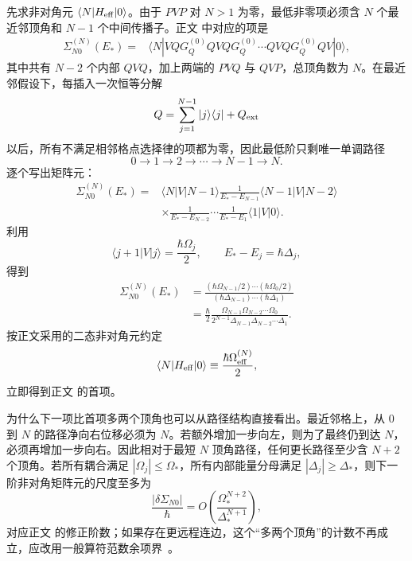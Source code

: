 \begin{derivation}
先求非对角元 $\langle N|H_{\rm eff}|0\rangle$。由于 $PVP$ 对 $N>1$ 为零，最低非零项必须含 $N$ 个最近邻顶角和 $N-1$ 个中间传播子。正文 中对应的项是
\begin{align*}
 \Sigma_{N0}^{(N)}(E_*)
 ={}&\langle N|VQG_Q^{(0)}QVQG_Q^{(0)}\cdots
 QVQG_Q^{(0)}QV|0\rangle,
\end{align*}
其中共有 $N-2$ 个内部 $QVQ$，加上两端的 $PVQ$ 与 $QVP$，总顶角数为 $N$。在最近邻假设下，每插入一次恒等分解
\begin{equation*}
 Q=\sum_{j=1}^{N-1}|j\rangle\langle j|+Q_{\rm ext}
\end{equation*}
以后，所有不满足相邻格点选择律的项都为零，因此最低阶只剩唯一单调路径
\begin{equation*}
 0\to1\to2\to\cdots\to N-1\to N.
\end{equation*}
逐个写出矩阵元：
\begin{align*}
 \Sigma_{N0}^{(N)}(E_*)
 ={}&\langle N|V|N-1\rangle
 \frac1{E_*-E_{N-1}}
 \langle N-1|V|N-2\rangle\\
 &\times\frac1{E_*-E_{N-2}}
 \cdots
 \frac1{E_*-E_1}
 \langle1|V|0\rangle.
\end{align*}
利用
\begin{equation*}
 \langle j+1|V|j\rangle=\frac{\hbar\Omega_j}{2},
 \qquad
 E_*-E_j=\hbar\Delta_j,
\end{equation*}
得到
\begin{align*}
 \Sigma_{N0}^{(N)}(E_*)
 &=\frac{(\hbar\Omega_{N-1}/2)\cdots(\hbar\Omega_0/2)}
 {(\hbar\Delta_{N-1})\cdots(\hbar\Delta_1)}\\
 &=\frac{\hbar}{2}
 \frac{\Omega_{N-1}\Omega_{N-2}\cdots\Omega_0}
 {2^{N-1}\Delta_{N-1}\Delta_{N-2}\cdots\Delta_1}.
\end{align*}
按正文采用的二态非对角元约定
\begin{equation*}
 \langle N|H_{\rm eff}|0\rangle
 \equiv\frac{\hbar\Omega_{\rm eff}^{(N)}}2,
\end{equation*}
立即得到正文 的首项。

为什么下一项比首项多两个顶角也可以从路径结构直接看出。最近邻格上，从 $0$ 到 $N$ 的路径净向右位移必须为 $N$。若额外增加一步向左，则为了最终仍到达 $N$，必须再增加一步向右。因此相对于最短 $N$ 顶角路径，任何更长路径至少含 $N+2$ 个顶角。若所有耦合满足 $|\Omega_j|\le\Omega_*$，所有内部能量分母满足 $|\Delta_j|\ge\Delta_*$，则下一阶非对角矩阵元的尺度至多为
\begin{equation*}
 \frac{|\delta\Sigma_{N0}|}{\hbar}
 =O\!\left(
 \frac{\Omega_*^{N+2}}{\Delta_*^{N+1}}
 \right),
\end{equation*}
对应正文 的修正阶数；如果存在更远程连边，这个“多两个顶角”的计数不再成立，应改用一般算符范数余项界~。


\end{derivation}
